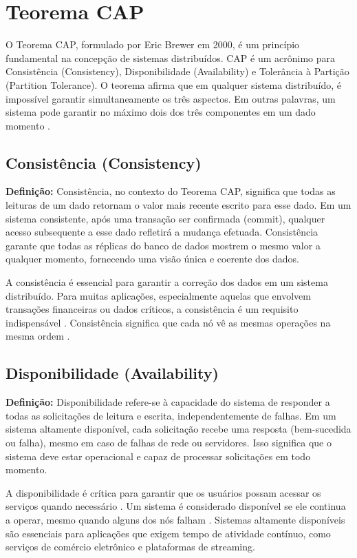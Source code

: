 \section{Teorema CAP}

O Teorema CAP, formulado por Eric Brewer em 2000, é um princípio fundamental na concepção de sistemas distribuídos. CAP é um acrônimo para Consistência (Consistency), Disponibilidade (Availability) e Tolerância à Partição (Partition Tolerance). O teorema afirma que em qualquer sistema distribuído, é impossível garantir simultaneamente os três aspectos. Em outras palavras, um sistema pode garantir no máximo dois dos três componentes em um dado momento \cite{brewer2000}.

\subsection{Consistência (Consistency)}

\textbf{Definição:} Consistência, no contexto do Teorema CAP, significa que todas as leituras de um dado retornam o valor mais recente escrito para esse dado. Em um sistema consistente, após uma transação ser confirmada (commit), qualquer acesso subsequente a esse dado refletirá a mudança efetuada. Consistência garante que todas as réplicas do banco de dados mostrem o mesmo valor a qualquer momento, fornecendo uma visão única e coerente dos dados.

A consistência é essencial para garantir a correção dos dados em um sistema distribuído. Para muitas aplicações, especialmente aquelas que envolvem transações financeiras ou dados críticos, a consistência é um requisito indispensável \cite{brewer2000}. Consistência significa que cada nó vê as mesmas operações na mesma ordem \cite{brewer2000}.
\subsection{Disponibilidade (Availability)}

\textbf{Definição:} Disponibilidade refere-se à capacidade do sistema de responder a todas as solicitações de leitura e escrita, independentemente de falhas. Em um sistema altamente disponível, cada solicitação recebe uma resposta (bem-sucedida ou falha), mesmo em caso de falhas de rede ou servidores. Isso significa que o sistema deve estar operacional e capaz de processar solicitações em todo momento.

A disponibilidade é crítica para garantir que os usuários possam acessar os serviços quando necessário \cite{brewer2000}. Um sistema é considerado disponível se ele continua a operar, mesmo quando alguns dos nós falham \cite{brewer2000}. Sistemas altamente disponíveis são essenciais para aplicações que exigem tempo de atividade contínuo, como serviços de comércio eletrônico e plataformas de streaming.


